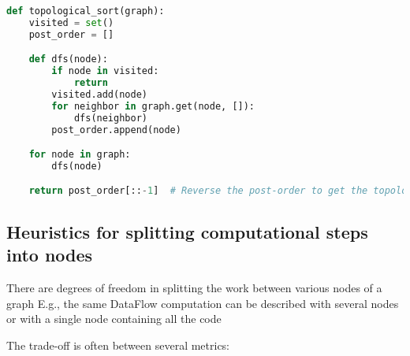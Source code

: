 \documentclass[11pt, reqno]{amsart}
\theoremstyle{definition}
\theoremstyle{remark}
\begin{document}
  \begin{lstlisting}[language=Python]
def topological_sort(graph):
    visited = set()
    post_order = []

    def dfs(node):
        if node in visited:
            return
        visited.add(node)
        for neighbor in graph.get(node, []):
            dfs(neighbor)
        post_order.append(node)

    for node in graph:
        dfs(node)

    return post_order[::-1]  # Reverse the post-order to get the topological order
\end{lstlisting}

  \subsection{Heuristics for splitting computational steps into nodes}

  There are degrees of freedom in splitting the work between various nodes of a graph
  E.g., the same DataFlow computation can be described with several nodes or with
  a single node containing all the code

  The trade-off is often between several metrics:
\end{document}
